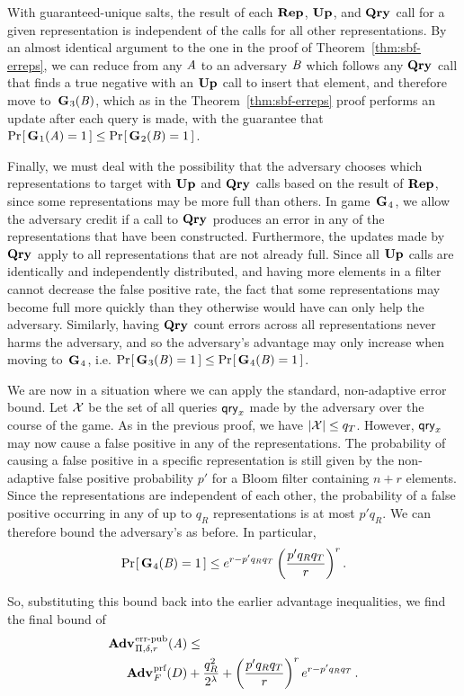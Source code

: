 With guaranteed-unique salts, the result of each $\textup{\textbf{Rep}}\hspace{0.5pt}$, $\textup{\textbf{Up}}\hspace{0.5pt}$, and $\textup{\textbf{Qry}}\hspace{0.5pt}$
call for a given representation is independent of the calls for all other
representations. By an almost identical argument to the one in the proof of
Theorem~\ref{thm:sbf-erreps}, we can reduce from any $\mathit{A}$ to an adversary
$\mathit{B}$ which follows any $\textup{\textbf{Qry}}\hspace{0.5pt}$ call that finds a true negative with an
$\textup{\textbf{Up}}\hspace{0.5pt}$ call to insert that element, and therefore move to~$\textup{\textbf{G}}\hspace{0.5pt}_3(\mathit{B})$,
which as in the Theorem~\ref{thm:sbf-erreps} proof performs an update after each
query is made, with the guarantee that $\Pr\hspace{-1pt}\left[\,\textup{\textbf{G}}\hspace{0.5pt}_1(\mathit{A}) = 1\,\right] \le
\Pr\hspace{-1pt}\left[\,\textup{\textbf{G}}\hspace{0.5pt}_2(\mathit{B}) = 1\,\right]$.

Finally, we must deal with the possibility that the adversary chooses which
representations to target with $\textup{\textbf{Up}}\hspace{0.5pt}$ and $\textup{\textbf{Qry}}\hspace{0.5pt}$ calls based on the result of
$\textup{\textbf{Rep}}\hspace{0.5pt}$, since some representations may be more full than others. In
game~$\textup{\textbf{G}}\hspace{0.5pt}_4$, we allow the adversary credit if a call to
$\textup{\textbf{Qry}}\hspace{0.5pt}$ produces an error in any of the representations that have been
constructed. Furthermore, the updates made by $\textup{\textbf{Qry}}\hspace{0.5pt}$ apply to all
representations that are not already full. Since all $\textup{\textbf{Up}}\hspace{0.5pt}$ calls are
identically and independently distributed, and having more elements in a filter
cannot decrease the false positive rate, the fact that some representations may
become full more quickly than they otherwise would have can only help the
adversary. Similarly, having $\textup{\textbf{Qry}}\hspace{0.5pt}$ count errors across all representations
never harms the adversary, and so the adversary's advantage may only increase
when moving to~$\textup{\textbf{G}}\hspace{0.5pt}_4$,
i.e. $\Pr\hspace{-1pt}\left[\,\textup{\textbf{G}}\hspace{0.5pt}_3(\mathit{B}) = 1\,\right] \le \Pr\hspace{-1pt}\left[\,\textup{\textbf{G}}\hspace{0.5pt}_4(\mathit{B}) = 1\,\right]$.

We are now in a situation where we can apply the standard, non-adaptive error
bound. Let $\mathcal{X}$ be the set of all queries $\mathsf{qry}_x$ made by the adversary over
the course of the game. As in the previous proof, we have $|\mathcal{X}| \le q_T$.
However, $\mathsf{qry}_x$ may now cause a false positive in any of the representations.
The probability of causing a false positive in a specific representation is
still given by the non-adaptive false positive probability $p'$ for a Bloom
filter containing $n+r$ elements. Since the representations are independent of
each other, the probability of a false positive occurring in any of up to $q_R$
representations is at most $p'q_R$. We can therefore bound the adversary's
as before. In particular,
\begin{equation}
   \Pr\hspace{-1pt}\left[\,\textup{\textbf{G}}\hspace{0.5pt}_4(\mathit{B})=1\,\right] \le
     e^{r-p'q_Rq_T}\left(\frac{p'q_Rq_T}{r}\right)^r.
\end{equation}

So, substituting this bound back into the earlier advantage inequalities, we find the final bound of
\begin{equation*}
  \begin{aligned}
    \Adv{\errep}_{\Pi,\delta,r}(\advA) &\leq \\
      \Adv{\prf}_F(D) &  +
    \frac{q_R^2}{2^\lambda} +
    \left(\frac{p'q_Rq_T}{r}\right)^re^{r-p'q_Rq_T} \,.
  \end{aligned}
\end{equation*}
